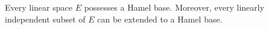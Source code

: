 Every linear space $E$ possesses a Hamel base. Moreover, every linearly independent subset of $E$ can be extended to a Hamel base.
